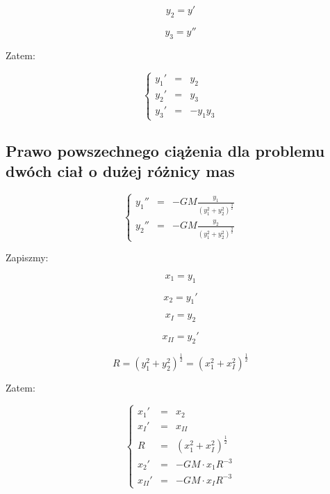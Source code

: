 \documentclass{article}
\begin{document}
	\begin{equation}
		y_2 = y'
	\end{equation}

	\begin{equation}
		y_3 = y''
	\end{equation}


	\newpage

	Zatem:

	\begin{equation}
		\left\{\begin{array}{rcl}
			y_1'&=&y_2\\
			y_2'&=&y_3\\
			y_3'&=&-y_1y_3
			\end{array} \right.
	\end{equation}


	\subsection*{Prawo powszechnego ciążenia dla problemu dwóch ciał o dużej różnicy mas}

	\begin{equation}
		\left\{\begin{array}{rcl}
			y_1''&=&-GM \frac{y_1}{(y_1^2+y_2^2)^{\frac{3}{2}}}\\
			y_2''&=&-GM \frac{y_2}{(y_1^2+y_2^2)^{\frac{3}{2}}}
			\end{array} \right.
	\end{equation}

	Zapiszmy:

	\begin{equation}
		x_1 = y_1
	\end{equation}

	\begin{equation}
		x_2 = y_1'
	\end{equation}

	\begin{equation}
		x_{I} = y_2
	\end{equation}

	\begin{equation}
		x_{II} = y_2'
	\end{equation}

	\begin{equation}
		R = (y_1^2+y_2^2)^{\frac{1}{2}} = (x_1^2+x_I^2)^{\frac{1}{2}}
	\end{equation}

	Zatem:

	\begin{equation}
		\left\{\begin{array}{rcl}
			x_1'&=&x_2\\
			x_I'&=&x_{II}\\
			R &=& (x_1^2+x_I^2)^{\frac{1}{2}}\\
			x_2'&=&-GM \cdot x_1 R^{-3}\\
			x_{II}'&=&-GM  \cdot x_I R^{-3}
			\end{array} \right.
	\end{equation}
\end{document}
